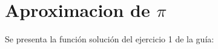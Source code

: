 \section{Aproximacion de $\pi$}

  Se presenta la función solución del ejercicio 1 de la guía:
  
  